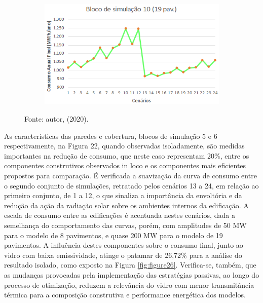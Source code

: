 \begin{figure}[H]
\begin{subfigure}[b]{0.49\textwidth}
    \end{subfigure}
    \begin{subfigure}[b]{0.49\textwidth}
        \includegraphics[width=\textwidth]{figures/result/fig28-bloco10.png}
    \end{subfigure}
    \begin{flushleft}
        \par \small Fonte: autor, (2020).
    \end{flushleft}
    \label{fig:figure25}
\end{figure}
\noindent As características das paredes e cobertura, blocos de simulação 5 e 6 respectivamente, na Figura 22, quando observadas isoladamente, são medidas importantes na redução de consumo, que neste caso representam 20\%, entre os componentes construtivos observados in loco e os componentes mais eficientes propostos para comparação. É verificada a suavização da curva de consumo entre o segundo conjunto de simulações, retratado pelos cenários 13 a 24, em relação ao primeiro conjunto, de 1 a 12, o que sinaliza a importância da envoltória e da redução da ação da radiação solar sobre os ambientes internos da edificação. A escala de consumo entre as edificações é acentuada nestes cenários, dada a semelhança do comportamento das curvas, porém, com amplitudes de 50 MW para o modelo de 8 pavimentos, e quase 200 MW para o modelo de 19 pavimentos.\vspace*{0.3cm} \newline
\noindent A influência destes componentes sobre o consumo final, junto ao vidro com baixa emissividade, atinge  o  patamar  de  26,72\%  para  a  análise  do  resultado  isolado,  como  exposto  na  Figura  \ref{fig:figure26}. Verifica-se, também, que as mudanças provocadas pela implementação das estratégias passivas, ao  longo  do  processo  de  otimização,  reduzem  a  relevância  do  vidro  com  menor  transmitância térmica para a composição construtiva e performance energética dos modelos.

